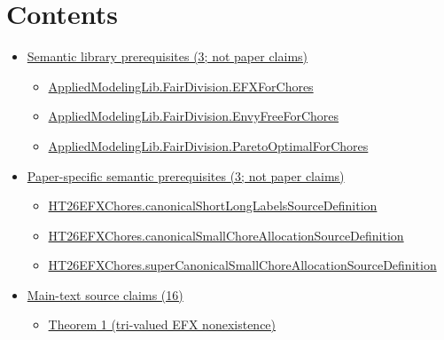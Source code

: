 \documentclass[10pt]{article}
\begin{document}
\section*{Contents}
\begin{itemize}[leftmargin=1.2em]
\item \hyperlink{library-section-de5e5601682a1524}{Semantic library prerequisites (3; not paper claims)}
\begin{itemize}[leftmargin=1.2em]
\item \hyperlink{library-prerequisite-cc4bb81e3f6310d6}{Applied\allowbreak{}Modeling\allowbreak{}Lib.\allowbreak{}Fair\allowbreak{}Division.\allowbreak{}EFX\allowbreak{}For\allowbreak{}Chores}
\item \hyperlink{library-prerequisite-283bac4b270e431c}{Applied\allowbreak{}Modeling\allowbreak{}Lib.\allowbreak{}Fair\allowbreak{}Division.\allowbreak{}Envy\allowbreak{}Free\allowbreak{}For\allowbreak{}Chores}
\item \hyperlink{library-prerequisite-95d7f6c33ea68817}{Applied\allowbreak{}Modeling\allowbreak{}Lib.\allowbreak{}Fair\allowbreak{}Division.\allowbreak{}Pareto\allowbreak{}Optimal\allowbreak{}For\allowbreak{}Chores}
\end{itemize}
\item \hyperlink{paper-prerequisite-section-5ef5ef0364b6939c}{Paper-specific semantic prerequisites (3; not paper claims)}
\begin{itemize}[leftmargin=1.2em]
\item \hyperlink{paper-prerequisite-fd04b7b4fbc6f835}{HT26\allowbreak{}EFX\allowbreak{}Chores.\allowbreak{}canonical\allowbreak{}Short\allowbreak{}Long\allowbreak{}Labels\allowbreak{}Source\allowbreak{}Definition}
\item \hyperlink{paper-prerequisite-efb704bbc61ee065}{HT26\allowbreak{}EFX\allowbreak{}Chores.\allowbreak{}canonical\allowbreak{}Small\allowbreak{}Chore\allowbreak{}Allocation\allowbreak{}Source\allowbreak{}Definition}
\item \hyperlink{paper-prerequisite-b0f133a4a33c9a55}{HT26\allowbreak{}EFX\allowbreak{}Chores.\allowbreak{}super\allowbreak{}Canonical\allowbreak{}Small\allowbreak{}Chore\allowbreak{}Allocation\allowbreak{}Source\allowbreak{}Definition}
\end{itemize}
\item \hyperlink{source-section-0c7af8265958a9ea}{Main-text source claims (16)}
\begin{itemize}[leftmargin=1.2em]
\item \hyperlink{source-claim-707062c38758c055}{Theorem 1 (tri-valued EFX nonexistence)}

\end{itemize}
\end{itemize}
\end{document}
